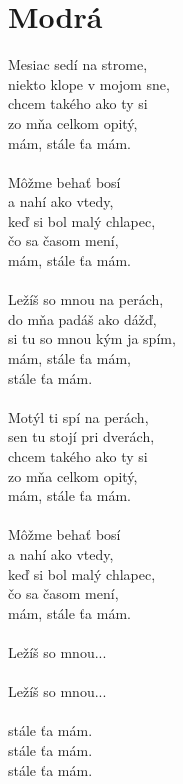 \section{Modrá}
Mesiac sedí na strome,\\
niekto klope v mojom sne,\\
chcem takého ako ty si\\
zo mňa celkom opitý,\\
mám, stále ťa mám.\\
\\
Môžme behať bosí\\
a nahí ako vtedy,\\
keď si bol malý chlapec,\\
čo sa časom mení,\\
mám, stále ťa mám.\\
\\
Ležíš so mnou na perách,\\
do mňa padáš ako dážď,\\
si tu so mnou kým ja spím,\\
mám, stále ťa mám,\\
stále ťa mám.\\
\\
Motýl ti spí na perách,\\
sen tu stojí pri dverách,\\
chcem takého ako ty si\\
zo mňa celkom opitý,\\
mám, stále ťa mám.\\
\\
Môžme behať bosí\\
a nahí ako vtedy,\\
keď si bol malý chlapec,\\
čo sa časom mení,\\
mám, stále ťa mám.\\
\\
Ležíš so mnou...\\
\\
Ležíš so mnou...\\
\\
stále ťa mám.\\
stále ťa mám.\\
stále ťa mám.\\